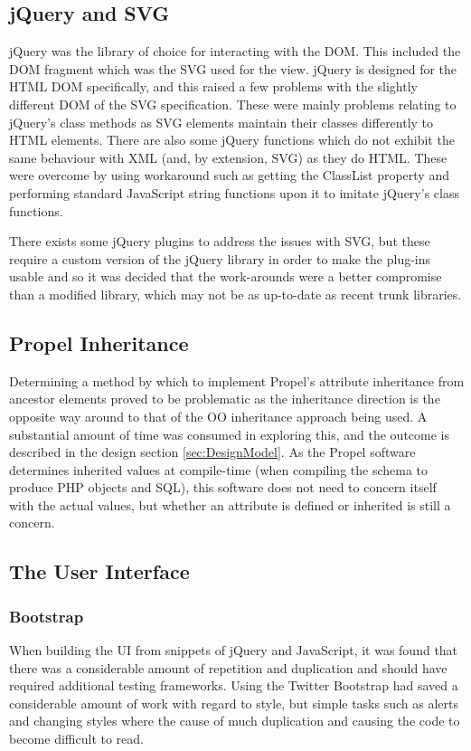 \subsection{jQuery and SVG}
jQuery was the library of choice for interacting with the DOM. This included the DOM fragment which was the SVG used for the view. jQuery is designed for the HTML DOM specifically, and this raised a few problems with the slightly different DOM of the SVG specification. These were mainly problems relating to jQuery's class methods as SVG elements maintain their classes differently to HTML elements. There are also some jQuery functions which do not exhibit the same behaviour with XML (and, by extension, SVG) as they do HTML. These were overcome by using workaround such as getting the ClassList property and performing standard Java\-Script string functions upon it to imitate jQuery's class functions.

There exists some jQuery plugins to address the issues with SVG, but these require a custom version of the jQuery library in order to make the plug-ins usable and so it was decided that the work-arounds were a better compromise than a modified library, which may not be as up-to-date as recent trunk libraries.

\subsection{Propel Inheritance}
Determining a method by which to implement Propel's attribute inheritance from ancestor elements proved to be problematic as the inheritance direction is the opposite way around to that of the OO inheritance approach being used. A substantial amount of time was consumed in exploring this, and the outcome is described in the design section \ref{sec:DesignModel}. As the Propel software determines inherited values at compile-time (when compiling the schema to produce PHP objects and SQL), this software does not need to concern itself with the actual values, but whether an attribute is defined or inherited is still a concern.

\subsection{The User Interface}
\subsubsection{Bootstrap}
When building the UI from snippets of jQuery and Java\-Script, it was found that there was a considerable amount of repetition and duplication and should have required additional testing frameworks. Using the Twitter Bootstrap had saved a considerable amount of work with regard to style, but simple tasks such as alerts and changing styles where the cause of much duplication and causing the code to become difficult to read.

